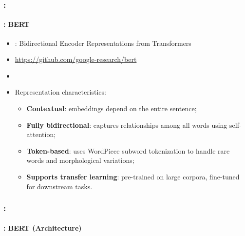 \documentclass[xcolor=table]{beamer}
\begin{document}
\begin{frame}
	\frametitle{\insertshortsubtitle: \insertsection}
	\framesubtitle{\insertsubsection: BERT}
	
	\begin{minipage}{.71\textwidth}
		\begin{itemize}
			\item {}: Bidirectional Encoder Representations from Transformers
			\item \url{https://github.com/google-research/bert}
			\item \cite{2019-devlin-al}
			\item Representation characteristics:
			\begin{itemize}
				\item \textbf{Contextual}: embeddings depend on the entire sentence;
				\item \textbf{Fully bidirectional}: captures relationships among all words using self-attention;
				\item \textbf{Token-based}: uses WordPiece subword tokenization to handle rare words and morphological variations;
				\item \textbf{Supports transfer learning}: pre-trained on large corpora, fine-tuned for downstream tasks.
			\end{itemize}
		\end{itemize}
	\end{minipage}
	\begin{minipage}{.27\textwidth}
		\vspace{1.1cm}
	\end{minipage}
	
\end{frame}


\begin{frame}
	\frametitle{\insertshortsubtitle: \insertsection}
	\framesubtitle{\insertsubsection: BERT (Architecture)}
	
	\begin{center}
	\end{center}
	
\end{frame}
\end{document}
